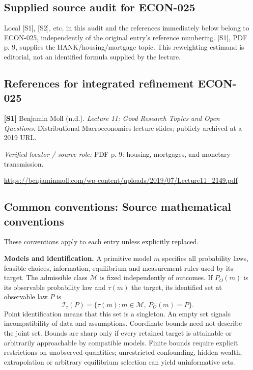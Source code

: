 \documentclass[11pt,a4paper]{article}
\begin{document}
\subsection*{Supplied source audit for ECON-025}
Local [S1], [S2], etc. in this audit and the references immediately below
belong to ECON-025, independently of the original entry's reference numbering.
[S1], PDF p. 9, supplies the HANK/housing/mortgage topic. This reweighting estimand is editorial, not an identified formula supplied by the lecture.
\subsection*{References for integrated refinement ECON-025}
{\footnotesize\raggedright
\par\noindent\textbf{[S1]} Benjamin Moll (n.d.). \emph{Lecture 11: Good Research Topics and Open Questions}. Distributional Macroeconomics lecture slides; publicly archived at a 2019 URL.\par \textit{Verified locator / source role:} PDF p. 9: housing, mortgages, and monetary transmission.\par \url{https://benjaminmoll.com/wp-content/uploads/2019/07/Lecture11_2149.pdf}\par\smallskip
}

\subsection*{Common conventions: Source mathematical conventions}

These conventions apply to each entry unless explicitly replaced.

\textbf{Models and identification.} A primitive model \(m\) specifies all probability laws, feasible choices, information, equilibrium and measurement rules used by its target. The admissible class \(\mathcal M\) is fixed independently of outcomes. If \(P_O(m)\) is its observable probability law and \(\tau(m)\) the target, its identified set at observable law \(P\) is
\[
 \mathcal I_\tau(P)=\{\tau(m):m\in\mathcal M,\ P_O(m)=P\}.
\]
Point identification means that this set is a singleton. An empty set signals incompatibility of data and assumptions. Coordinate bounds need not describe the joint set. Bounds are sharp only if every retained target is attainable or arbitrarily approachable by compatible models. Finite bounds require explicit restrictions on unobserved quantities; unrestricted confounding, hidden wealth, extrapolation or arbitrary equilibrium selection can yield uninformative sets.
\end{document}
